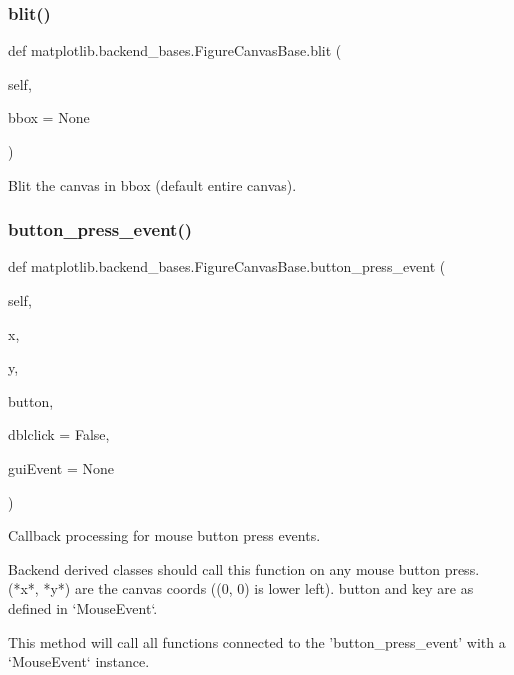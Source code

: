 \subsubsection{\texorpdfstring{blit()}{blit()}}
{\footnotesize\ttfamily def matplotlib.\+backend\+\_\+bases.\+Figure\+Canvas\+Base.\+blit (\begin{DoxyParamCaption}\item[{}]{self,  }\item[{}]{bbox = {\ttfamily None} }\end{DoxyParamCaption})}

\begin{DoxyVerb}Blit the canvas in bbox (default entire canvas).\end{DoxyVerb}
 \mbox{\label{classmatplotlib_1_1backend__bases_1_1FigureCanvasBase_aa0da6d8db1a58abefb2c24bdbd93e43e}} 
\subsubsection{\texorpdfstring{button\+\_\+press\+\_\+event()}{button\_press\_event()}}
{\footnotesize\ttfamily def matplotlib.\+backend\+\_\+bases.\+Figure\+Canvas\+Base.\+button\+\_\+press\+\_\+event (\begin{DoxyParamCaption}\item[{}]{self,  }\item[{}]{x,  }\item[{}]{y,  }\item[{}]{button,  }\item[{}]{dblclick = {\ttfamily False},  }\item[{}]{gui\+Event = {\ttfamily None} }\end{DoxyParamCaption})}

\begin{DoxyVerb}Callback processing for mouse button press events.

Backend derived classes should call this function on any mouse
button press.  (*x*, *y*) are the canvas coords ((0, 0) is lower left).
button and key are as defined in `MouseEvent`.

This method will call all functions connected to the
'button_press_event' with a `MouseEvent` instance.
\end{DoxyVerb}
 \mbox{\label{classmatplotlib_1_1backend__bases_1_1FigureCanvasBase_a414a8fafb074945bf907b21552b3d8b0}} 
